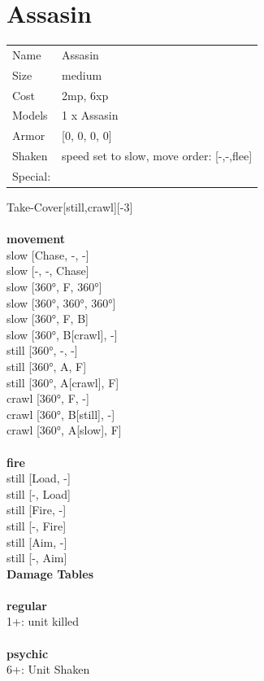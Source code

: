 {\clearpage

\section{ Assasin }

\begin{tabular}{ll}
  Name & Assasin \\
  Size & medium\\
  Cost & 2mp, 6xp\\
  Models & 1 x Assasin\\
  Armor & [0, 0, 0, 0]\\
  Shaken & speed set to slow, move order: [-,-,flee]\\
  Special: \\
\end{tabular}

\noindent Take-Cover[still,crawl][-3]\\ 


\ \\ {\bf movement } \\
slow [Chase, -, -] \\
slow [-, -, Chase] \\
slow [360°, F, 360°] \\
slow [360°, 360°, 360°] \\
slow [360°, F, B] \\
slow [360°, B[crawl], -] \\
still [360°, -, -] \\
still [360°, A, F] \\
still [360°, A[crawl], F] \\
crawl [360°, F, -] \\
crawl [360°, B[still], -] \\
crawl [360°, A[slow], F] \\
\ \\ {\bf fire } \\
still [Load, -] \\
still [-, Load] \\
still [Fire, -] \\
still [-, Fire] \\
still [Aim, -] \\
still [-, Aim] \\


{\bf Damage Tables} \\
\ \\ {\bf regular } \\
1+: unit killed \\
\ \\ {\bf psychic } \\
6+: Unit Shaken \\


}
